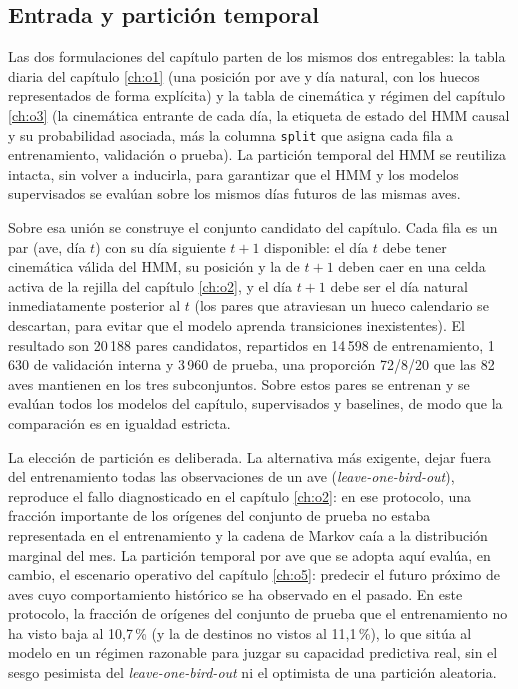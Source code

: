 \subsection{Entrada y partición temporal}
\label{sec:o4-datos}

Las dos formulaciones del capítulo parten de los mismos dos entregables: la tabla
diaria del capítulo \ref{ch:o1} (una posición por ave y día natural, con los huecos
representados de forma explícita) y la tabla de cinemática y régimen del capítulo
\ref{ch:o3} (la cinemática entrante de cada día, la etiqueta de estado del HMM causal
y su probabilidad asociada, más la columna \texttt{split} que asigna cada fila a
entrenamiento, validación o prueba). La partición temporal del HMM se reutiliza
intacta, sin volver a inducirla, para garantizar que el HMM y los modelos
supervisados se evalúan sobre los mismos días futuros de las mismas aves.

Sobre esa unión se construye el conjunto candidato del capítulo. Cada fila es un par
(ave, día $t$) con su día siguiente $t+1$ disponible: el día $t$ debe tener
cinemática válida del HMM, su posición y la de $t+1$ deben caer en una celda activa
de la rejilla del capítulo \ref{ch:o2}, y el día $t+1$ debe ser el día natural
inmediatamente posterior al $t$ (los pares que atraviesan un hueco calendario se
descartan, para evitar que el modelo aprenda transiciones inexistentes). El resultado
son 20\,188 pares candidatos, repartidos en 14\,598 de entrenamiento, 1\,630 de
validación interna y 3\,960 de prueba, una proporción 72/8/20 que las 82 aves
mantienen en los tres subconjuntos. Sobre estos pares se entrenan y se evalúan todos
los modelos del capítulo, supervisados y baselines, de modo que la comparación es en
igualdad estricta.

La elección de partición es deliberada. La alternativa más exigente, dejar fuera del
entrenamiento todas las observaciones de un ave (\textit{leave-one-bird-out}),
reproduce el fallo diagnosticado en el capítulo \ref{ch:o2}: en ese protocolo, una
fracción importante de los orígenes del conjunto de prueba no estaba representada en
el entrenamiento y la cadena de Markov caía a la distribución marginal del mes. La
partición temporal por ave que se adopta aquí evalúa, en cambio, el escenario
operativo del capítulo \ref{ch:o5}: predecir el futuro próximo de aves cuyo
comportamiento histórico se ha observado en el pasado. En este protocolo, la fracción
de orígenes del conjunto de prueba que el entrenamiento no ha visto baja al 10,7\,\%
(y la de destinos no vistos al 11,1\,\%), lo que sitúa al modelo en un régimen
razonable para juzgar su capacidad predictiva real, sin el sesgo pesimista del
\textit{leave-one-bird-out} ni el optimista de una partición aleatoria.

